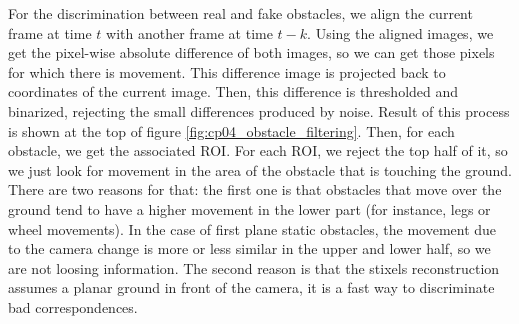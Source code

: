 For the discrimination between real and fake obstacles, we align the current frame at time $t$ with another frame at time $t - k$. Using the aligned images, we get the pixel-wise absolute difference of both images, so we can get those pixels for which there is movement. This difference image is projected back to coordinates of the current image. Then, this difference is thresholded and binarized, rejecting the small differences produced by noise. Result of this process is shown at the top of figure \ref{fig:cp04_obstacle_filtering}. Then, for each obstacle, we get the associated \ac{ROI}. For each ROI, we reject the top half of it, so we just look for movement in the area of the obstacle that is touching the ground. There are two reasons for that: the first one is that obstacles that move over the ground tend to have a higher movement in the lower part (for instance, legs or wheel movements). In the case of first plane static obstacles, the movement due to the camera change is more or less similar in the upper and lower half, so we are not loosing information. The second reason is that the stixels reconstruction assumes a planar ground in front of the camera, it is a fast way to discriminate bad correspondences.

